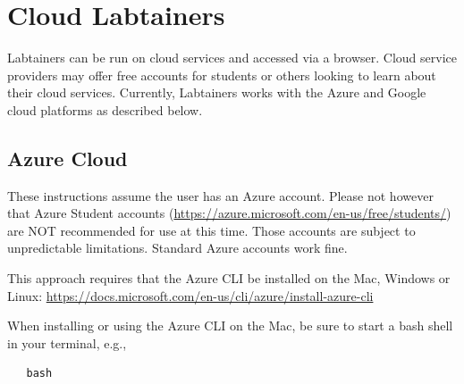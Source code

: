 \documentclass[12pt]{article}
\begin{document}
\section{Cloud Labtainers}
\label{cloud-labtainers}
Labtainers can be run on cloud services and accessed via a browser.
Cloud service providers may offer free accounts for students or others looking to learn about their cloud services.
Currently, Labtainers works with the Azure and Google cloud platforms as described below.

\subsection{Azure Cloud}
These instructions assume the user 
has an Azure account. Please not however that Azure Student accounts (\url{https://azure.microsoft.com/en-us/free/students/})
are NOT recommended for use at this time.  Those accounts are subject to unpredictable limitations.  Standard Azure accounts 
work fine.

This approach requires that the Azure CLI be installed on  the Mac, Windows or Linux:
\url{https://docs.microsoft.com/en-us/cli/azure/install-azure-cli}

When installing or using the Azure CLI on the Mac, be sure to start a bash shell in your terminal, e.g.,
\begin{verbatim}
   bash
\end{verbatim}
\end{document}
